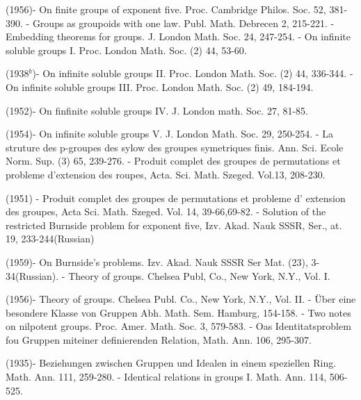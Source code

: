\begin{thebibliography}{99}
  (1956)- On finite groups of exponent
  five. Proc. Cambridge Philos. Soc. 52, 381-390. 
- Groups as groupoids
  with one law. Publ. Math. Debrecen 2, 215-221. 
-
  Embedding theorems for groups. J. London Math. Soc. 24, 247-254. 
- On infinite soluble groups
  I. Proc. London Math. Soc. (2) 44, 53-60. 

  (1938$^b$)- On infinite soluble groups II. Proc. London
  Math. Soc. (2) 44, 336-344. 
\pageoriginale - On infinite soluble
  groups III. Proc. London Math. Soc. (2) 49, 184-194. 

  (1952)- On finfinite soluble groups IV. J. London
  math. Soc. 27, 81-85. 

  (1954)- On infinite soluble groups V. J. London
  Math. Soc. 29, 250-254. 
- La struture des p-groupes des sylow
  des groupes symetriques finis. Ann. Sci. Ecole Norm. Sup. (3) 65,
  239-276. 
- Produit complet
  des groupes de permutations et probleme d'extension des roupes,
  Acta. Sci. Math. Szeged. Vol.13, 208-230. 

  (1951) - Produit complet des groupes de permutations et
  probleme d' extension des groupes, Acta Sci. Math. Szeged. Vol. 14,
  39-66,69-82. 
- Solution of the restricted
  Burnside problem for exponent five, Izv. Akad. Nauk SSSR,
  Ser., at. 19, 233-244(Russian) 

  (1959)- On Burnside's problems. Izv. Akad. Nauk SSSR
  Ser Mat. (23), 3-34(Russian). 
- Theory of groups. Chelsea Publ, Co.,
  New York, N.Y., Vol. I. 

  (1956)- Theory of groups. Chelsea Publ. Co., New York,
  N.Y., Vol. II. 
- \"Uber eine
  besondere Klasse von Gruppen Abh. Math. Sem. Hamburg, 154-158. 
- Two notes on nilpotent
  groups. Proc. Amer. Math. Soc. 3, 579-583.
- Oas Identitatsproblem fou Gruppen
  miteiner definierenden Relation, Math. Ann. 106, 295-307. 

  (1935)- Beziehungen zwischen Gruppen und Idealen in
  einem speziellen Ring. Math. Ann. 111, 259-280. 
\pageoriginale - Identical
  relations in groups I. Math. Ann. 114, 506-525. 


\end{thebibliography}
